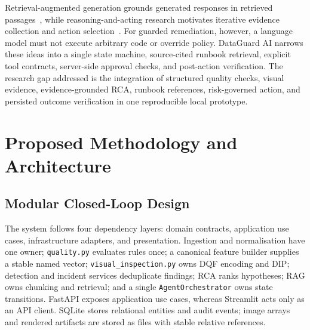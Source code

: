 \documentclass[conference]{IEEEtran}
\begin{document}
Retrieval-augmented generation grounds generated responses in retrieved passages~\cite{rag}, while reasoning-and-acting research motivates iterative evidence collection and action selection~\cite{react}. For guarded remediation, however, a language model must not execute arbitrary code or override policy. DataGuard AI narrows these ideas into a single state machine, source-cited runbook retrieval, explicit tool contracts, server-side approval checks, and post-action verification. The research gap addressed is the integration of structured quality checks, visual evidence, evidence-grounded RCA, runbook references, risk-governed action, and persisted outcome verification in one reproducible local prototype.

\section{Proposed Methodology and Architecture}
\subsection{Modular Closed-Loop Design}
The system follows four dependency layers: domain contracts, application use cases, infrastructure adapters, and presentation. Ingestion and normalisation have one owner; \texttt{quality.py} evaluates rules once; a canonical feature builder supplies a stable named vector; \texttt{visual\_inspection.py} owns DQF encoding and DIP; detection and incident services deduplicate findings; RCA ranks hypotheses; RAG owns chunking and retrieval; and a single \texttt{AgentOrchestrator} owns state transitions. FastAPI exposes application use cases, whereas Streamlit acts only as an API client. SQLite stores relational entities and audit events; image arrays and rendered artifacts are stored as files with stable relative references.
\end{document}
